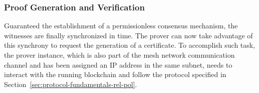 \subsubsection{Proof Generation and Verification} \label{sec:pol-implementation:proof-generation-verification}

Guaranteed the establishment of a permissionless consensus mechanism, the witnesses are finally synchronized in time. The prover can now take advantage of this synchrony to request the generation of a \pol{} certificate. To accomplish such task, the prover instance, which is also part of the mesh network communication channel and has been assigned an IP address in the same subnet, needs to interact with the running blockchain and follow the protocol specified in Section~\ref{sec:protocol-fundamentals-rel-pol}. 


